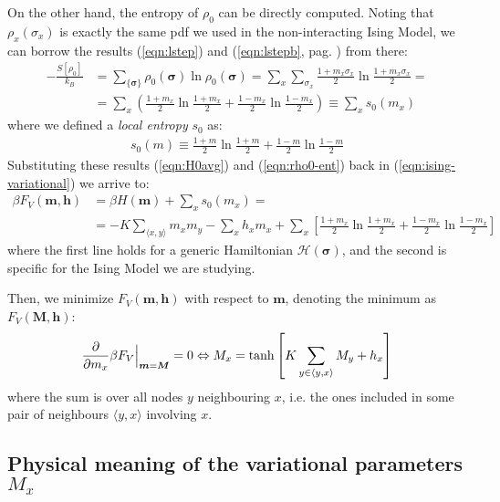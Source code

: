 \documentclass[../../main.tex]{subfiles}
\begin{document}
On the other hand, the entropy of $\rho_0$ can be directly computed. Noting that $\rho_x(\sigma_x)$ is exactly the same pdf we used in the non-interacting Ising Model, we can borrow the results (\ref{eqn:lstep}) and (\ref{eqn:lstepb}, pag. \pageref{eqn:lstep}) from there:
\begin{align}\nonumber
    -\frac{S[\rho_0]}{k_B} &= \sum_{\{\bm{\sigma}\}} \rho_0(\bm{\sigma}) \ln \rho_0(\bm{\sigma}) = \sum_x \sum_{\sigma_x} \frac{1+m_x \sigma_x}{2} \ln \frac{1+m_x \sigma_x}{2} =\\ \label{eqn:rho0-ent}
    &= \sum_x \left(\frac{1+m_x}{2} \ln \frac{1+m_x}{2} + \frac{1-m_x}{2} \ln \frac{1-m_x}{2} \right)  \equiv \sum_x s_0(m_x)
\end{align}
where we defined a \textit{local entropy} $s_0$ as: 
\begin{align*}
    s_0(m) \equiv \frac{1+m}{2} \ln \frac{1+m}{2} + \frac{1-m}{2} \ln \frac{1-m}{2}    
\end{align*}
Substituting these results (\ref{eqn:H0avg}) and (\ref{eqn:rho0-ent}) back in (\ref{eqn:ising-variational}) we arrive to:
\begin{align*}
    \beta F_V(\bm{m}, \bm{h}) &= \beta H(\bm{m}) + \sum_x s_0(m_x) =\\
    &= -K \sum_{\langle x,y \rangle} m_x m_y - \sum_x h_x m_x + \sum_x \left[\frac{1+m_x}{2} \ln \frac{1+m_x}{2} + \frac{1-m_x}{2} \ln \frac{1-m_x}{2}    \right]
\end{align*}
where the first line holds for a generic Hamiltonian $\mathcal{H}(\bm{\sigma})$, and the second is specific for the Ising Model we are studying.

\medskip

Then, we minimize $F_V(\bm{m}, \bm{h})$ with respect to $\bm{m}$, denoting the minimum as $F_V(\bm{M}, \bm{h})$:
\begin{align*}
    \pdv{m_x} \beta F_V \Big|_{\bm{m} = \bm{M}} = 0 \Leftrightarrow M_x = \tanh \left[K \sum_{y \in \langle y, x\rangle} M_y + h_x\right]
\end{align*} %
where the sum is over all nodes $y$ neighbouring $x$, i.e. the ones included in some pair of neighbours $\langle y,x \rangle$ involving $x$.

\subsection{Physical meaning of the variational parameters $M_x$}
\end{document}

